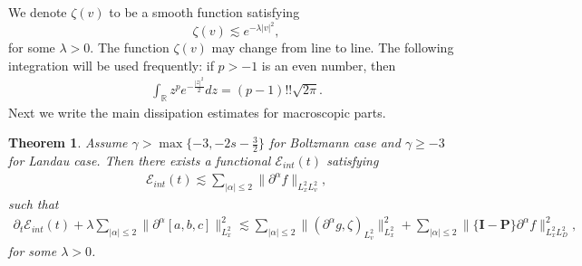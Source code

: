 \documentclass[reqno,a4paper]{amsart}
\newtheorem{Thm}{Theorem}[section]
\numberwithin{equation}{section}
\newcommand{\1}{\mathbf{1}}
\newcommand{\R}{\mathbb{R}}
\renewcommand{\P}{\mathbf{P}}
\newcommand{\E}{\mathcal{E}}
\newcommand{\<}{\langle}
\renewcommand{\>}{\rangle}
\newcommand{\I}{\mathbf{I}}
\renewcommand{\P}{\mathbf{P}}
\begin{document}
	We denote $\zeta(v)$ to be a smooth function satisfying $$
	\zeta(v)\lesssim e^{-\lambda|v|^2},$$ for some $\lambda >0$. The function $\zeta(v)$ may change from line to line. The following integration will be used frequently: if $p>-1$ is an even number, then 
	\begin{align*}
		\int_{\R}z^pe^{-\frac{|z|^2}{2}}dz = (p-1)!!\sqrt{2\pi}.
	\end{align*}
Next we write the main dissipation estimates for macroscopic parts. 
	\begin{Thm}\label{Thm31}
		Assume $\gamma>\max\{-3,-2s-\frac{3}{2}\}$ for Boltzmann case and $\gamma\ge -3$ for Landau case. 
		Then there exists a functional $\E_{int}(t)$ satisfying 
		\begin{align*}
			\E_{int}(t)\lesssim \sum_{|\alpha|\le 2}\|\partial^\alpha f\|_{L^2_xL^2_v},
		\end{align*} such that 
		\begin{align}\label{121}
			\partial_t\E_{int}(t) + \lambda\sum_{|\alpha|\le 2}\|\partial^\alpha [{a},{b},{c}]\|^2_{L^2_{x}}
			\lesssim \sum_{|\alpha|\le 2}\|({\partial^\alpha g},\zeta)_{L^2_v}\|^2_{L^2_{x}}+\sum_{|\alpha|\le 2}\|\{\I-\P\}{\partial^\alpha  f}\|^2_{L^2_{x}L^2_D},
		\end{align}for some $\lambda>0$. 
	\end{Thm}
\end{document}
